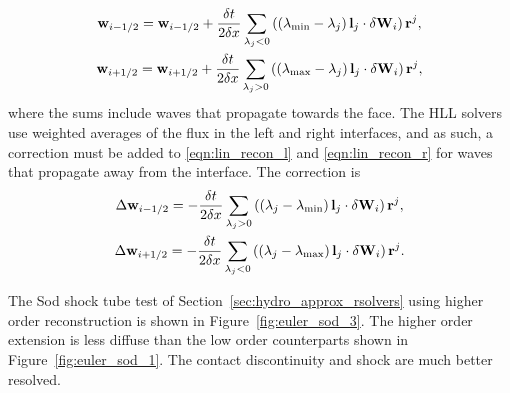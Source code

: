 \begin{gather}
\label{eqn:lin_recon_l}
\mathbf{w}_{i-1/2} = \mathbf{w}_{i-1/2} + \frac{\delta t}{2\delta x} \sum_{\lambda_j < 0} 
                 \left(\left(\lambda_{\min} - \lambda_j\right) \mathbf{l}_j 
                 \cdot \mathbf{\delta} \mathbf{W}_i\right) \mathbf{r}^j, \\
\label{eqn:lin_recon_r}
\mathbf{w}_{i+1/2} = \mathbf{w}_{i+1/2} + \frac{\delta t}{2\delta x} \sum_{\lambda_j > 0} 
                 \left(\left(\lambda_{\max} - \lambda_j\right) \mathbf{l}_j 
                 \cdot \mathbf{\delta} \mathbf{W}_i\right) \mathbf{r}^j, 
\end{gather}
where the sums include waves that propagate towards the face.  The HLL solvers use weighted averages of the flux in the left and right interfaces, and as such, a correction must be added to \eqref{eqn:lin_recon_l} and \eqref{eqn:lin_recon_r} for waves that propagate away from the interface.  The correction is \citep{Colella:1984}
\begin{gather}
\Delta \mathbf{w}_{i-1/2} = -\frac{\delta t}{2\delta x} \sum_{\lambda_j > 0} 
                 \left(\left(\lambda_j - \lambda_{\min}\right) \mathbf{l}_j 
                 \cdot \mathbf{\delta} \mathbf{W}_i\right) \mathbf{r}^j, \\
\Delta \mathbf{w}_{i+1/2} = -\frac{\delta t}{2\delta x} \sum_{\lambda_j < 0} 
                 \left(\left(\lambda_j - \lambda_{\max}\right) \mathbf{l}_j 
                 \cdot \mathbf{\delta} \mathbf{W}_i\right) \mathbf{r}^j. 
\end{gather}

The Sod shock tube test of Section~\ref{sec:hydro_approx_rsolvers} using higher order reconstruction is shown in Figure~\ref{fig:euler_sod_3}.  The higher order extension is less diffuse than the low order counterparts shown in Figure~\ref{fig:euler_sod_1}.  The contact discontinuity and shock are much better resolved.

